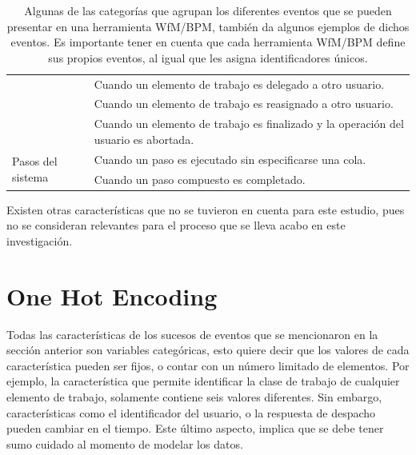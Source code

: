 \begin{table}
\begin{tabular}{l | p{10cm}}
                \cmidrule{2-2}
                & Cuando un elemento de trabajo es delegado a otro usuario. \\ 
                \cmidrule{2-2}
                & Cuando un elemento de trabajo es reasignado a otro usuario. \\ 
                \cmidrule{2-2}
                & Cuando un elemento de trabajo es finalizado y la operación del usuario es abortada. \\ 
        \midrule
            \multirow{2}{*}{Pasos del sistema} 
                & \multicolumn{1}{p{10cm}}{Cuando un paso es ejecutado sin especificarse una cola.} \\
                \cmidrule{2-2}
                & Cuando un paso compuesto es completado. \\ 
        
        \bottomrule
    \end{tabular}
    \caption[Ejemplo de eventos presentados en una herramienta WfM/BPM]{Algunas de las categorías que agrupan los diferentes eventos que se pueden presentar en una herramienta WfM/BPM, también da algunos ejemplos de dichos eventos. Es importante tener en cuenta que cada herramienta WfM/BPM define sus propios eventos, al igual que les asigna identificadores únicos.}
    \label{table:tipos_eventos}
\end{table}

Existen otras características que no se tuvieron en cuenta para este estudio, pues no se consideran relevantes para el proceso que se lleva acabo en este investigación. 


\section{One Hot Encoding} %
\label{section2.2}

Todas las características de los sucesos de eventos que se mencionaron en la sección anterior son variables categóricas, esto quiere decir que los valores de cada característica pueden ser fijos, o contar con un número limitado de elementos. Por ejemplo, la característica que permite identificar la clase de trabajo de cualquier elemento de trabajo, solamente contiene seis valores diferentes. Sin embargo, características como el identificador del usuario, o la respuesta de despacho pueden cambiar en el tiempo. Este último aspecto, implica que se debe tener sumo cuidado al momento de modelar los datos.

